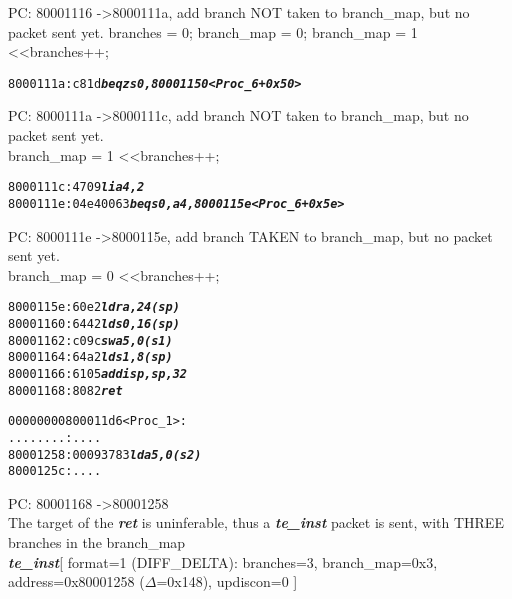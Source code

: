 \begin{enumerate}
  \begin {frame}

    PC: 80001116 -\textgreater 8000111a, add branch NOT taken to branch\_map, but no packet sent yet.
    branches = 0; branch\_map = 0;
    branch\_map \textbar= 1 \textless\textless branches++;
  \end{frame}
  

  \begin {alltt}
    8000111a:	c81d                    \textbf{\textit{beqz	s0,80001150 <Proc\_6+0x50>}}
  \end{alltt}
  
  \begin {frame}

  PC: 8000111a -\textgreater 8000111c, add branch NOT taken to branch\_map, but no packet sent yet.\\
  branch\_map \textbar= 1 \textless\textless branches++;
  \end{frame}
  

  \begin {alltt}
    8000111c:   4709                    \textbf{\textit{li      a4,2}}
    8000111e:   04e40063                \textbf{\textit{beq     s0,a4,8000115e <Proc\_6+0x5e>}}
  \end{alltt}
  
  \begin {frame}

  PC: 8000111e -\textgreater 8000115e, add branch TAKEN to branch\_map, but no packet sent yet.\\
  branch\_map \textbar= 0 \textless\textless branches++;
  \end{frame}
  

  \begin {alltt}
    8000115e:	60e2                	\textbf{\textit{ld	ra,24(sp)}}
    80001160:	6442                	\textbf{\textit{ld	s0,16(sp)}}
    80001162:	c09c                	\textbf{\textit{sw	a5,0(s1)}}
    80001164:	64a2                	\textbf{\textit{ld	s1,8(sp)}}
    80001166:	6105                	\textbf{\textit{addi	sp,sp,32}}
    80001168:	8082                	\textbf{\textit{ret}}
  
00000000800011d6 <Proc\_1>:
    ........:   ....
    80001258:	00093783          	\textbf{\textit{ld	a5,0(s2)}}
    8000125c:	....
  \end{alltt}


  \begin {frame}

  PC: 80001168 -\textgreater 80001258\\
  The target of the \textbf{\textit{ret}} is uninferable, thus a \textbf{\textit{te\_inst}} packet is sent, with THREE branches in the branch\_map\\
  \textbf{\textit{te\_inst}}[ format=1 (DIFF\_DELTA): branches=3, branch\_map=0x3, address=0x80001258 ($\Delta$=0x148), updiscon=0 ]
  \end{frame}
  

\end{enumerate}
